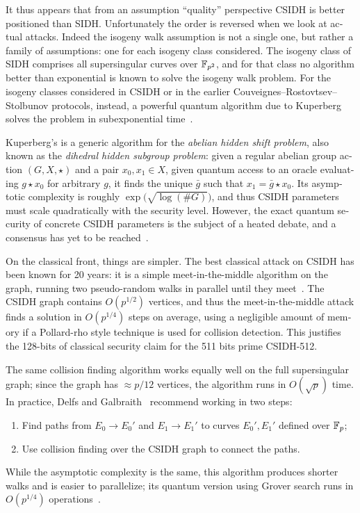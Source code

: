 \begin{otherlanguage}{english}
It thus appears that from an assumption ``quality'' perspective CSIDH
is better positioned than SIDH.  Unfortunately the order is reversed
when we look at actual attacks.  Indeed the isogeny walk assumption is
not a single one, but rather a family of assumptions: one for each
isogeny class considered. The isogeny class of SIDH comprises all
supersingular curves over $\mathbb{F}_{p^2}$, and for that class no algorithm
better than exponential is known to solve the isogeny walk problem.
For the isogeny classes considered in CSIDH or in the earlier
Couveignes--Rostovtsev--Stolbunov protocols, instead, a powerful
quantum algorithm due to Kuperberg solves the problem in
subexponential
time~\cite{regev04,Kup,Kuperberg2013,childs2014constructing}.

Kuperberg's is a generic algorithm for the \emph{abelian hidden shift
  problem}, also known as the \emph{dihedral hidden subgroup problem}:
given a regular abelian group action $(G,X,\star)$ and a pair
$x_0,x_1\in X$, given quantum access to an oracle evaluating
$g\star x_0$ for arbitrary $g$, it finds the unique $\bar{g}$ such
that $x_1=\bar{g}\star x_0$. Its asymptotic complexity is roughly
$\exp\bigl(\sqrt{\log(\#G)}\bigr)$, and thus CSIDH parameters must
scale quadratically with the security level.  However, the exact
quantum security of concrete CSIDH parameters is the subject of a
heated debate, and a consensus has yet to be
reached~\cite{BIJ18,Jao-etal-kuperberg-2018,EC:BLMP19,EC:BonSch20,EC:Peikert20,cryptoeprint:2020:1520}.

On the classical front, things are simpler. The best classical attack
on CSIDH has been known for 20 years: it is a simple
meet-in-the-middle algorithm on the graph, running two pseudo-random
walks in parallel until they
meet~\cite{Gal,EC:GalHesSma02,galbraith+stolbunov11,Delfs2016}.  The
CSIDH graph contains $O(p^{1/2})$ vertices, and thus the
meet-in-the-middle attack finds a solution in $O(p^{1/4})$ steps on
average, using a negligible amount of memory if a Pollard-rho style
technique is used for collision detection. This justifies the 128-bits
of classical security claim for the 511 bits prime CSIDH-512.

The same collision finding algorithm works equally well on the full
supersingular graph; since the graph has $\approx p/12$ vertices, the
algorithm runs in $O(\sqrt{p})$ time.  In practice, Delfs and
Galbraith~\cite{Delfs2016} recommend working in two steps:
\begin{enumerate}
\item Find paths from $E_0\to E_0'$ and $E_1\to E_1'$ to curves
  $E_0',E_1'$ defined over $\mathbb{F}_p$;
\item Use collision finding over the CSIDH graph to connect the paths.
\end{enumerate}
While the asymptotic complexity is the same, this algorithm produces
shorter walks and is easier to parallelize; its quantum version using
Grover search runs in $O(p^{1/4})$ operations~\cite{INDOCRYPT:BiaJaoSan14}.


\end{otherlanguage}
